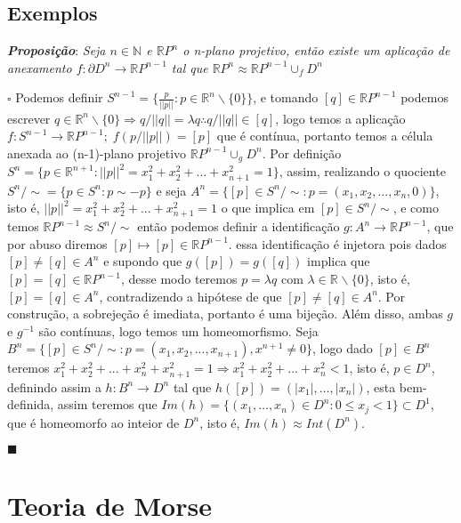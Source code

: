 \documentclass[12pt]{book}
\newcommand{\real}[1]{\mathbb{R}^{#1}}
\newcommand{\realprojetivo}[1]{\mathbb{R}P^{#1}}
\newcommand{\tese}[3]{\vspace{2mm} \textit{\textbf{#1}}: \textit{#2} \par $\square$ #3 \par $\blacksquare$}
\begin{document}
	\section{Exemplos}
	\tese{Proposição}{Seja $n \in \mathbb{N}$ e $\realprojetivo{n}$ o n-plano projetivo, então existe um aplicação de anexamento $f: \partial{D^{n}} \to \realprojetivo{n-1}$ tal que $\realprojetivo{n} \approx \realprojetivo{n-1} \cup_{f} D^{n}$}{Podemos definir $S^{n-1} =\{\frac{p}{||p||}: p  \in \real{n}\backslash\{0\}\}$, e tomando $[q] \in \realprojetivo{n-1}$ podemos escrever $q \in \real{n}\backslash\{0\} \Rightarrow q/||q|| = \lambda q \therefore q/||q|| \in [q]$, logo temos a aplicação  $f:S^{n-1} \to \realprojetivo{n-1}; \; f(p/||p||) = [p]$ que é contínua, portanto temos a célula anexada ao (n-1)-plano projetivo $\realprojetivo{n-1}\cup_{g}D^{n}$. Por definição $S^{n} = \{p \in \real{n+1}: ||p||^{2} = x_{1}^{2}+x_{2}^{2}+...+x_{n+1}^{2}=1\}$, assim, realizando o quociente $S^{n}/\sim = \{p \in S^{n}: p \sim -p\}$ e seja $A^{n} = \{[p] \in S^{n}/\sim:  p = (x_{1},x_{2},...,x_{n}, 0)\}$, isto é, $||p||^{2} = x_{1}^{2}+x_{2}^{2}+...+x_{n+1}^{2}=1$ o que implica em $[p] \in S^{n}/\sim$, e como temos $\realprojetivo{n-1} \approx S^{n}/\sim $ então podemos definir a identificação $g:A^{n} \to \realprojetivo{n-1}$, que por abuso diremos $[p] \longmapsto [p] \in \realprojetivo{n-1}$. essa identificação é injetora pois dados $[p] \neq [q] \in A^{n}$ e supondo que $g([p]) = g([q])$ implica que $[p] = [q] \in \realprojetivo{n-1}$, desse modo teremos $p = \lambda q$ com $\lambda \in \real{}\backslash\{0\}$, isto é, $[p]=[q] \in A^{n}$, contradizendo a hipótese de que $[p]\neq[q] \in A^{n}$. Por construção, a sobrejeção é imediata, portanto é uma bijeção. Além disso, ambas $g$ e $g^{-1}$ são contínuas, logo temos um homeomorfismo. Seja $B^{n} = \{[p] \in S^{n}/\sim:  p = (x_{1},x_{2},..., x_{n+1}), x^{n+1} \neq 0\}$, logo dado $[p] \in B^{n}$ teremos $x_{1}^{2}+x_{2}^{2}+...+x_{n}^{2}+x_{n+1}^{2}=1 \Rightarrow x_{1}^{2}+x_{2}^{2}+...+x_{n}^{2} < 1$, isto é, $p \in D^{n}$, definindo assim a $h : B^{n} \to D^{n}$ tal que $h([p]) = (|x_{1}|,\dots, |x_{n}|)$, esta bem-definida, assim teremos que $Im(h) = \{(x_{1},\dots, x_{n}) \in D^{n}: 0 \leq x_{j} < 1 \} \subset D^{1}$, que é homeomorfo ao inteior de $D^{n}$, isto é, $Im(h) \approx Int(D^{n})$. }
	

	
	
	\chapter{Teoria de Morse}
\end{document}
